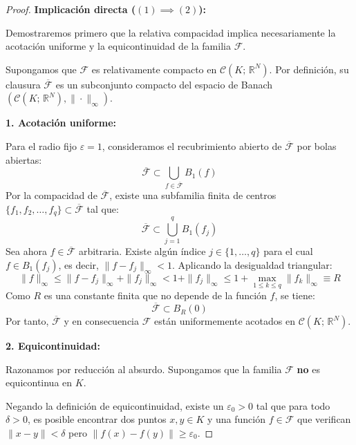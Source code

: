 \begin{proof}
    \textbf{Implicación directa ($(1) \implies (2)$):}

    Demostraremos primero que la relativa compacidad implica necesariamente la acotación uniforme y la equicontinuidad de la familia $\mathcal{F}$.

    Supongamos que $\mathcal{F}$ es relativamente compacto en $\mathcal{C}(K; \, \mathbb{R}^N)$. Por definición, su clausura $\overline{\mathcal{F}}$ es un subconjunto compacto del espacio de Banach $(\mathcal{C}(K; \, \mathbb{R}^N), \|\cdot\|_\infty)$.

    \medskip

    \textbf{1. Acotación uniforme:}

    Para el radio fijo $\varepsilon = 1$, consideramos el recubrimiento abierto de $\overline{\mathcal{F}}$ por bolas abiertas:
    \[
        \overline{\mathcal{F}} \subset \bigcup_{f \in \overline{\mathcal{F}}} B_1(f)
    \]
    Por la compacidad de $\overline{\mathcal{F}}$, existe una subfamilia finita de centros $\{f_1, f_2, \dots, f_q\} \subset \overline{\mathcal{F}}$ tal que:
    \[
        \overline{\mathcal{F}} \subset \bigcup_{j=1}^q B_1(f_j)
    \]
    Sea ahora $f \in \overline{\mathcal{F}}$ arbitraria. Existe algún índice $j \in \{1, \dots, q\}$ para el cual $f \in B_1(f_j)$, es decir, $\|f - f_j\|_\infty < 1$. Aplicando la desigualdad triangular:
    \[
        \|f\|_\infty \leq \|f - f_j\|_\infty + \|f_j\|_\infty < 1 + \|f_j\|_\infty \leq 1 + \max_{1 \leq k \leq q} \|f_k\|_\infty \equiv R
    \]
    Como $R$ es una constante finita que no depende de la función $f$, se tiene:
    \[
        \overline{\mathcal{F}} \subset B_R(0)
    \]
    Por tanto, $\overline{\mathcal{F}}$ y en consecuencia $\mathcal{F}$ están uniformemente acotados en $\mathcal{C}(K; \, \mathbb{R}^N)$.

    \medskip

    \textbf{2. Equicontinuidad:}

    Razonamos por reducción al absurdo. Supongamos que la familia $\mathcal{F}$ \textbf{no} es equicontinua en $K$. 

    Negando la definición de equicontinuidad, existe un $\varepsilon_0 > 0$ tal que para todo $\delta > 0$, es posible encontrar dos puntos $x, y \in K$ y una función $f \in \mathcal{F}$ que verifican $\|x - y\| < \delta$ pero $\|f(x) - f(y)\| \geq \varepsilon_0$.


\end{proof}
